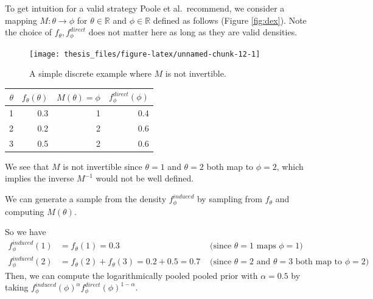 \documentclass[12pt,twoside]{smiththesis}
\begin{document}
To get intuition for a valid strategy Poole et al.~recommend, we consider a mapping \(M: \theta \to \phi\) for \(\theta \in \mathbb{R}\) and \(\phi \in \mathbb{R}\)
defined as follows (Figure \ref{fig:dex}). Note the choice of \(f_\theta,f_\phi^{direct}\) does not matter here as long as they are valid densities.
\begin{multicols}{2}
\begin{figure}

{\centering \texttt{[image: thesis\_files/figure-latex/unnamed-chunk-12-1]} 

}

\caption{\label{fig:dex}A simple discrete example where $M$ is not invertible.}\label{fig:unnamed-chunk-12}
\end{figure}
\columnbreak
\begin{table}[H]
\centering
\begin{tabular}[t]{r|r|r|r}
\hline
$\theta$ & $f_\theta(\theta)$ & $M(\theta)=\phi$ & $f_\phi^{direct}(\phi)$\\
\hline
1 & 0.3 & 1 & 0.4\\
\hline
2 & 0.2 & 2 & 0.6\\
\hline
3 & 0.5 & 2 & 0.6\\
\hline
\end{tabular}
\end{table}
\end{multicols}
We see that \(M\) is not invertible since \(\theta=1\) and \(\theta = 2\) both map to \(\phi=2\), which implies the inverse \(M^{-1}\) would not be well defined.

We can generate a sample from the density \(f_\phi^{induced}\) by sampling from \(f_\theta\) and computing \(M(\theta)\).

So we have
\begin{align*}
f_\phi^{induced}(1) &= f_{\theta}(1) = 0.3 & \text{ (since $\theta = 1$ maps $\phi = 1$) } \\
f_\phi^{induced}(2) &= f_{\theta}(2) +  f_{\theta}(3) = 0.2 + 0.5=  0.7 & \text{ (since $\theta = 2$ and $\theta=3$ both map to $\phi = 2$) }
\end{align*}
Then, we can compute the logarithmically pooled pooled prior with \(\alpha=0.5\) by taking \(f_\phi^{induced}(\phi)^{\alpha} f_\phi^{direct}(\phi)^{1-\alpha}\).
\end{document}

